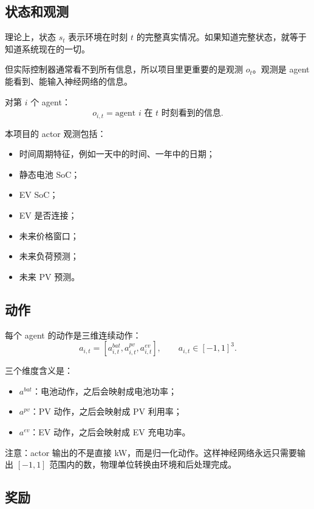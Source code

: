 \documentclass[UTF8,zihao=-4]{ctexart}
\begin{document}
\subsection{状态和观测}

理论上，状态 $s_t$ 表示环境在时刻 $t$ 的完整真实情况。如果知道完整状态，就等于知道系统现在的一切。

但实际控制器通常看不到所有信息，所以项目里更重要的是观测 $o_t$。观测是 agent 能看到、能输入神经网络的信息。

对第 $i$ 个 agent：
\begin{equation}
o_{i,t}=\text{agent }i\text{ 在 }t\text{ 时刻看到的信息}.
\end{equation}

本项目的 actor 观测包括：
\begin{itemize}
  \item 时间周期特征，例如一天中的时间、一年中的日期；
  \item 静态电池 SoC；
  \item EV SoC；
  \item EV 是否连接；
  \item 未来价格窗口；
  \item 未来负荷预测；
  \item 未来 PV 预测。
\end{itemize}

\subsection{动作}

每个 agent 的动作是三维连续动作：
\begin{equation}
a_{i,t}
=
\left[
a^{bat}_{i,t},
a^{pv}_{i,t},
a^{ev}_{i,t}
\right],
\qquad
a_{i,t}\in[-1,1]^3.
\end{equation}

三个维度含义是：
\begin{itemize}
  \item $a^{bat}$：电池动作，之后会映射成电池功率；
  \item $a^{pv}$：PV 动作，之后会映射成 PV 利用率；
  \item $a^{ev}$：EV 动作，之后会映射成 EV 充电功率。
\end{itemize}

注意：actor 输出的不是直接 kW，而是归一化动作。这样神经网络永远只需要输出 $[-1,1]$ 范围内的数，物理单位转换由环境和后处理完成。

\subsection{奖励}
\end{document}

